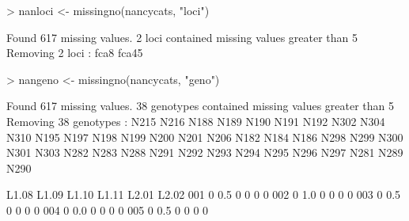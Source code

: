 \documentclass[letterpaper]{article}
\begin{document}
\begin{Schunk}
\begin{Sinput}
> nanloci <-  missingno(nancycats, "loci")
\end{Sinput}
\begin{Soutput}
 Found 617 missing values.
 2 loci contained missing values greater than 5%
 Removing 2 loci : fca8 fca45 
\end{Soutput}
\begin{Sinput}
> nangeno <-  missingno(nancycats, "geno")
\end{Sinput}
\begin{Soutput}
 Found 617 missing values.
 38 genotypes contained missing values greater than 5%
 Removing 38 genotypes : N215 N216 N188 N189 N190 N191 N192 N302 N304 N310 
N195 N197 N198 N199 N200 N201 N206 N182 N184 N186 N298 N299 N300 N301 N303 N282 
N283 N288 N291 N292 N293 N294 N295 N296 N297 N281 N289 N290 
\end{Soutput}
\begin{Soutput}
    L1.08 L1.09 L1.10 L1.11 L2.01 L2.02
001     0   0.5     0     0     0     0
002     0   1.0     0     0     0     0
003     0   0.5     0     0     0     0
004     0   0.0     0     0     0     0
005     0   0.5     0     0     0     0
\end{Soutput}
\end{Schunk}
\end{document}
